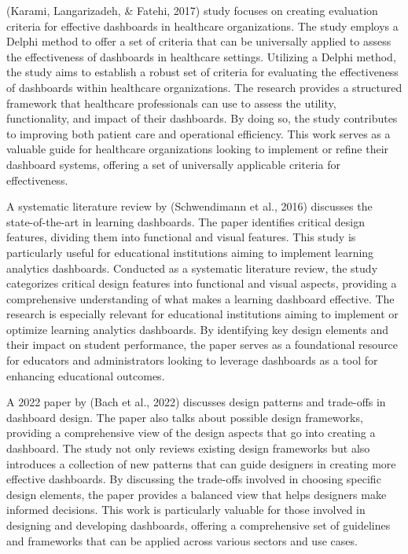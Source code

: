 \documentclass[print]{nuthesis}
\begin{document}
(Karami, Langarizadeh, \& Fatehi, 2017) study focuses on creating evaluation criteria for effective dashboards in healthcare organizations.
The study employs a Delphi method to offer a set of criteria that can be universally applied to assess the effectiveness of dashboards in healthcare settings.
Utilizing a Delphi method, the study aims to establish a robust set of criteria for evaluating the effectiveness of dashboards within healthcare organizations.
The research provides a structured framework that healthcare professionals can use to assess the utility, functionality, and impact of their dashboards.
By doing so, the study contributes to improving both patient care and operational efficiency.
This work serves as a valuable guide for healthcare organizations looking to implement or refine their dashboard systems, offering a set of universally applicable criteria for effectiveness.

A systematic literature review by (Schwendimann et al., 2016) discusses the state-of-the-art in learning dashboards.
The paper identifies critical design features, dividing them into functional and visual features.
This study is particularly useful for educational institutions aiming to implement learning analytics dashboards.
Conducted as a systematic literature review, the study categorizes critical design features into functional and visual aspects, providing a comprehensive understanding of what makes a learning dashboard effective.
The research is especially relevant for educational institutions aiming to implement or optimize learning analytics dashboards.
By identifying key design elements and their impact on student performance, the paper serves as a foundational resource for educators and administrators looking to leverage dashboards as a tool for enhancing educational outcomes.

A 2022 paper by (Bach et al., 2022) discusses design patterns and trade-offs in dashboard design.
The paper also talks about possible design frameworks, providing a comprehensive view of the design aspects that go into creating a dashboard.
The study not only reviews existing design frameworks but also introduces a collection of new patterns that can guide designers in creating more effective dashboards.
By discussing the trade-offs involved in choosing specific design elements, the paper provides a balanced view that helps designers make informed decisions.
This work is particularly valuable for those involved in designing and developing dashboards, offering a comprehensive set of guidelines and frameworks that can be applied across various sectors and use cases.
\end{document}
